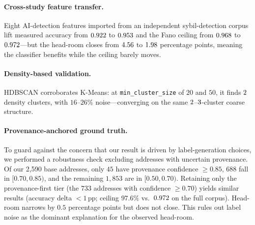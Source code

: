 \documentclass[11pt,a4paper]{article}
\begin{document}
\paragraph{Cross-study feature transfer.} Eight AI-detection features
imported from an independent sybil-detection corpus lift measured accuracy
from $0.922$ to $0.953$ and the Fano ceiling from $0.968$ to
$0.972$---but the head-room closes from $4.56$ to $1.98$ percentage
points, meaning the classifier benefits while the ceiling barely moves.

\paragraph{Density-based validation.} HDBSCAN corroborates K-Means: at
\texttt{min\_cluster\_size} of $20$ and $50$, it finds $2$ density
clusters, with $16$--$26\%$ noise---converging on the same $2$--$3$-cluster
coarse structure.

\paragraph{Provenance-anchored ground truth.} To guard against the
concern that our result is driven by label-generation choices, we
performed a robustness check excluding addresses with uncertain
provenance. Of our 2{,}590 base addresses, only $45$ have provenance
confidence $\geq 0.85$, $688$ fall in $[0.70, 0.85)$, and the
remaining $1{,}853$ are in $[0.50, 0.70)$. Retaining only the
provenance-first tier (the $733$ addresses with confidence
$\geq 0.70$) yields similar results (accuracy delta $< 1$\,pp;
ceiling $97.6\%$ vs.\ $0.972$ on the full corpus). Head-room
narrows by $0.5$ percentage points but does not close. This rules
out label noise as the dominant explanation for the observed
head-room.

\end{document}
